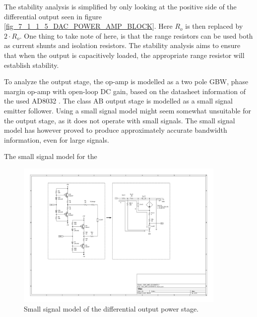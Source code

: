 The stability analysis is simplified by only looking at the positive side of the differential output seen in figure \ref{fig_7_1_1_5_DAC_POWER_AMP_BLOCK}. Here $R_o$ is then replaced by $2\cdot R_o$. One thing to take note of here, is that the range resistors can be used both as current shunts and isolation resistors. The stability analysis aims to ensure that when the output is capacitively loaded, the appropriate range resistor will establish stability.

To analyze the output stage, the op-amp is modelled as a two pole  GBW,  phase margin op-amp with  open-loop DC gain, based on the datasheet information of the used AD8032 \cite{AD8032_datasheet}. The class AB output stage is modelled as a small signal emitter follower. Using a small signal model might seem somewhat unsuitable for the output stage, as it does not operate with small signals. The small signal model has however proved to produce approximately accurate bandwidth information, even for large signals.

The small signal model for the 

\begin{figure}[H]
    \centering
    \includegraphics[clip, trim=50 20 100 100, width=0.9\textwidth]{Sections/7_SystemDesign/Figures/DAC_POWER_ss.pdf}
    \caption{Small signal model of the differential output power stage.}
    \label{fig_7_1_1_5_DAC_POWER_AMP_ss}
\end{figure}